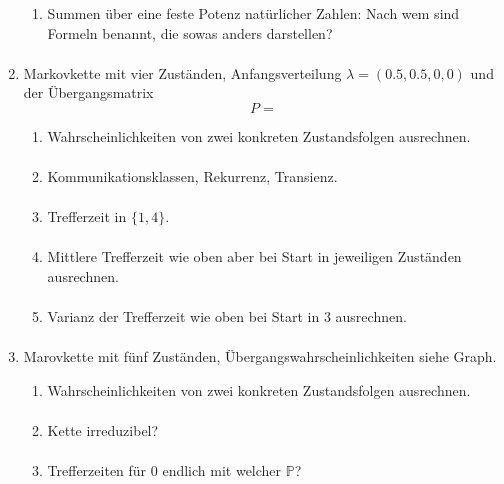 \documentclass[a4paper,11pt,notitlepage,fullpage]{article}
\newcommand{\p}{\mathbb P}
\begin{document}
\begin{enumerate}
\begin{enumerate}
\item Summen über eine feste Potenz natürlicher Zahlen: Nach wem sind Formeln benannt, die sowas anders darstellen?
\begin{align*}
\end{align*}
\end{enumerate}

\item Markovkette mit vier Zuständen, Anfangsverteilung $\lambda = (0.5, 0.5, 0, 0)$ und der Übergangsmatrix
$$P=$$
\begin{enumerate}
\item Wahrscheinlichkeiten von zwei konkreten Zustandsfolgen ausrechnen.
\begin{align*}
\end{align*}

\item Kommunikationsklassen, Rekurrenz, Transienz.
\begin{align*}
\end{align*}

\item Trefferzeit in $\{1, 4\}$.
\begin{align*}
\end{align*}

\item Mittlere Trefferzeit wie oben aber bei Start in jeweiligen Zuständen ausrechnen.
\begin{align*}
\end{align*}

\item Varianz der Trefferzeit wie oben bei Start in $3$ ausrechnen.
\begin{align*}
\end{align*}
\end{enumerate}

\item Marovkette mit fünf Zuständen, Übergangswahrscheinlichkeiten siehe Graph.
\begin{enumerate}
\item Wahrscheinlichkeiten von zwei konkreten Zustandsfolgen ausrechnen.
\begin{align*}
\end{align*}

\item Kette irreduzibel?
\begin{align*}
\end{align*}

\item Trefferzeiten für $0$ endlich mit welcher $\p$?
\begin{align*}
\end{align*}


\end{enumerate}
\end{enumerate}
\end{document}
